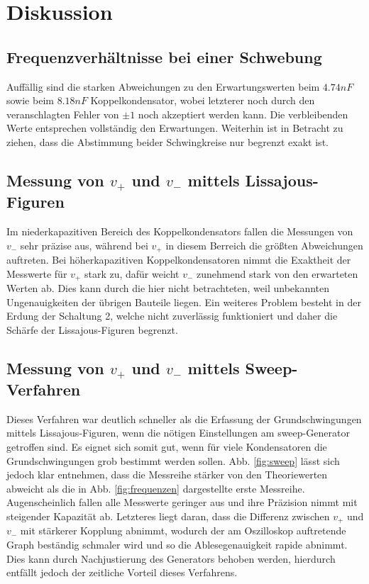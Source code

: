 \section{Diskussion}
\label{sec:Diskussion}

\subsection{Frequenzverhältnisse bei einer Schwebung}
\label{sec:Schwebung}

Auffällig sind die starken Abweichungen zu den Erwartungswerten beim $4.74nF$ sowie beim $8.18nF$ Koppelkondensator, wobei letzterer noch durch den veranschlagten Fehler von $\pm 1$ noch akzeptiert werden kann. Die verbleibenden Werte entsprechen vollständig den Erwartungen. Weiterhin ist in Betracht zu ziehen, dass die Abstimmung beider Schwingkreise nur begrenzt exakt ist.

\subsection{Messung von $v_+$ und $v_-$ mittels Lissajous-Figuren}
\label{sec:messung}

Im niederkapazitiven Bereich des Koppelkondensators fallen die Messungen von $v_-$ sehr präzise aus, während bei $v_+$ in diesem Berreich die größten Abweichungen auftreten. Bei höherkapazitiven Koppelkondensatoren nimmt die Exaktheit der Messwerte für $v_+$ stark zu, dafür weicht $v_-$ zunehmend stark von den erwarteten Werten ab. Dies kann durch die hier nicht betrachteten, weil unbekannten Ungenauigkeiten der übrigen Bauteile liegen. Ein weiteres Problem besteht in der Erdung der Schaltung 2, welche nicht zuverlässig funktioniert und daher die Schärfe der Lissajous-Figuren begrenzt.

\subsection{Messung von $v_+$ und $v_-$ mittels Sweep-Verfahren}
\label{sec:sweep}

Dieses Verfahren war deutlich schneller als die Erfassung der Grundschwingungen mittels Lissajous-Figuren, wenn die nötigen Einstellungen am sweep-Generator getroffen sind. Es eignet sich somit gut, wenn für viele Kondensatoren die Grundschwingungen grob bestimmt werden sollen. Abb. \ref{fig:sweep} lässt sich jedoch klar entnehmen, dass die Messreihe stärker von den Theoriewerten abweicht als die in Abb. \ref{fig:frequenzen} dargestellte erste Messreihe. Augenscheinlich fallen alle Messwerte geringer aus und ihre Präzision nimmt mit steigender Kapazität ab. Letzteres liegt daran, dass die Differenz zwischen $v_+$ und $v_-$ mit stärkerer Kopplung abnimmt, wodurch der am Oszilloskop auftretende Graph beständig schmaler wird und so die Ablesegenauigkeit rapide abnimmt. Dies kann durch Nachjustierung des Generators behoben werden, hierdurch entfällt jedoch der zeitliche Vorteil dieses Verfahrens.
